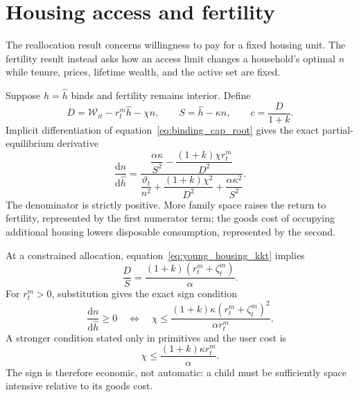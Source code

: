 \documentclass[11pt]{article}
\theoremstyle{definition}
\theoremstyle{remark}
\newcommand{\dd}{\mathrm d}
\begin{document}
\section{Housing access and fertility}

The reallocation result concerns willingness to pay for a fixed housing unit.
The fertility result instead asks how an access limit changes a household's
optimal $n$ while tenure, prices, lifetime wealth, and the active set are fixed.

Suppose $h=\widehat h$ binds and fertility remains interior.  Define
\begin{equation}
 D=\mathcal W_{it}-r_t^m\widehat h-\chi n,\qquad
 S=\widehat h-\kappa n,\qquad c=\frac{D}{1+k}.
 \label{eq:D_S_app}
\end{equation}
Implicit differentiation of equation~\eqref{eq:binding_cap_root} gives the exact
partial-equilibrium derivative
\begin{equation}
 \frac{\dd n}{\dd\widehat h}
 =\frac{
 \dfrac{\alpha\kappa}{S^2}
 -\dfrac{(1+k)\chi r_t^m}{D^2}}
 {\dfrac{\vartheta_t}{n^2}
 +\dfrac{(1+k)\chi^2}{D^2}
 +\dfrac{\alpha\kappa^2}{S^2}}.
 \label{eq:fertility_derivative_app}
\end{equation}
The denominator is strictly positive.  More family space raises the return to
fertility, represented by the first numerator term; the goods cost of occupying
additional housing lowers disposable consumption, represented by the second.

At a constrained allocation, equation~\eqref{eq:young_housing_kkt} implies
\begin{equation}
 \frac{D}{S}=\frac{(1+k)(r_t^m+\zeta_t^m)}{\alpha}.
 \label{eq:D_S_ratio}
\end{equation}
For $r_t^m>0$, substitution gives the exact sign condition
\begin{equation}
 \frac{\dd n}{\dd\widehat h}\geq0
 \quad\Longleftrightarrow\quad
 \chi\leq
 \frac{(1+k)\kappa(r_t^m+\zeta_t^m)^2}{\alpha r_t^m}.
 \label{eq:fertility_sign_app}
\end{equation}
A stronger condition stated only in primitives and the user cost is
\begin{equation}
 \chi\leq\frac{(1+k)\kappa r_t^m}{\alpha}.
 \label{eq:fertility_sufficient_app}
\end{equation}
The sign is therefore economic, not automatic: a child must be sufficiently
space intensive relative to its goods cost.
\end{document}
